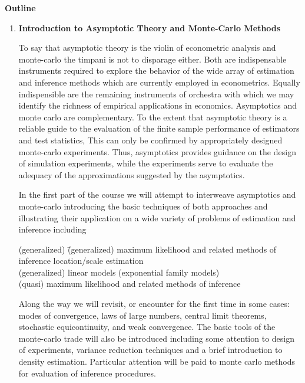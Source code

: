 \vspace{10mm}
\begin{center}
{\bf Outline}
\end{center}

\begin{enumerate}
\item {\bf Introduction to Asymptotic Theory and Monte-Carlo Methods}

To say that asymptotic theory is the violin of econometric analysis and 
monte-carlo  the timpani is not to disparage either.  Both are 
indispensable instruments required to explore the behavior of the 
wide array of estimation and inference methods which are currently 
employed in econometrics.  
Equally indispensible are the remaining instruments of orchestra with
which we may identify the richness of empirical applications in economics.
Asymptotics and monte carlo are complementary.  To the 
extent that asymptotic theory is a reliable guide to the evaluation of the 
finite sample performance of estimators and test statistics,  This can 
only be confirmed by appropriately designed monte-carlo experiments.  Thus,
asymptotics provides guidance on the design of simulation experiments, 
while the experiments serve to evaluate the adequacy of the approximations 
suggested by the asymptotics.

In the first part of the course we will attempt to interweave 
asymptotics and monte-carlo introducing the basic techniques of both 
approaches and illustrating their application on a wide variety of problems
of estimation and inference including

\begin{tabbing}
(generalized) \= (generalized) maximum likelihood and related methods of inference \kill
 \> location/scale estimation \\
 \> (generalized) linear models (exponential family models) \\
 \> (quasi) maximum likelihood and related methods of inference
\end{tabbing}

\noindent
Along the way we will revisit, or encounter for the first time in some 
cases:  modes of convergence, laws of large numbers, central 
limit theorems, stochastic equicontinuity, and weak convergence.  The basic
tools of the monte-carlo trade will also be introduced including some attention
to design of experiments, variance reduction techniques and a brief
introduction to density estimation.  Particular attention will be paid to
monte carlo methods for evaluation of inference procedures.  


\end{enumerate}
